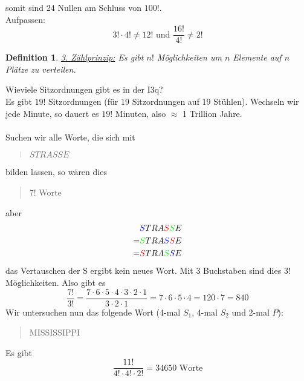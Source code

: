 \documentclass{report}
\newtheorem{mydef}{Definition}
\begin{document}
somit sind 24 Nullen am Schluss von $100!$.\\
Aufpassen:
\begin{equation}
3! \cdot 4! \neq 12! \mbox{ und } \frac{16!}{4!} \neq 2!
\end{equation}
\begin{mydef}
\underline{3. Zählprinzip:} Es gibt $n!$ Möglichkeiten um $n$ Elemente auf $n$ Plätze zu verteilen.
\end{mydef}
Wieviele Sitzordnungen gibt es in der I3q?\\
Es gibt $19!$ Sitzordnungen (für 19 Sitzordnungen auf 19 Stühlen). Wechseln wir jede Minute, so dauert es $19!$ Minuten, also $\approx$ 1 Trillion Jahre.\\\\
Suchen wir alle Worte, die sich mit
\begin{quote}
$STRASSE$
\end{quote}
bilden lassen, so wären dies
\begin{quote}
$7!$ Worte
\end{quote}
aber
\begin{align*}
 & \textcolor{blue}{S}TRA\textcolor{red}{S}\textcolor{green}{S}E\\
= & \textcolor{green}{S}TRA\textcolor{blue}{S}\textcolor{red}{S}E\\
= & \textcolor{red}{S}TRA\textcolor{green}{S}\textcolor{blue}{S}E
\end{align*}
das Vertauschen der S ergibt kein neues Wort. Mit 3 Buchstaben sind dies $3!$ Möglichkeiten. Also gibt es
\begin{equation}
\frac{7!}{3!} = \frac{7 \cdot 6 \cdot 5 \cdot 4 \cdot 3 \cdot 2 \cdot 1}{3 \cdot 2 \cdot 1} = 7 \cdot 6 \cdot 5 \cdot 4 = 120 \cdot 7 = 840
\end{equation}
Wir untersuchen nun das folgende Wort (4-mal $S_1$, 4-mal $S_2$ und 2-mal $P$):
\begin{quote}
MISSISSIPPI
\end{quote}
Es gibt
\begin{equation}
\frac{11!}{4! \cdot 4! \cdot 2!} = 34650 \mbox{ Worte}
\end{equation}
\end{document}

